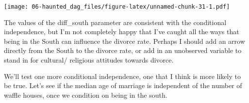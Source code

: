 \documentclass[
]{book}
\newenvironment{Shaded}{\begin{snugshade}}{\end{snugshade}}
\newcommand{\AttributeTok}[1]{\textcolor[rgb]{0.77,0.63,0.00}{#1}}
\newcommand{\DecValTok}[1]{\textcolor[rgb]{0.00,0.00,0.81}{#1}}
\newcommand{\FloatTok}[1]{\textcolor[rgb]{0.00,0.00,0.81}{#1}}
\newcommand{\FunctionTok}[1]{\textcolor[rgb]{0.00,0.00,0.00}{#1}}
\newcommand{\NormalTok}[1]{#1}
\newcommand{\OtherTok}[1]{\textcolor[rgb]{0.56,0.35,0.01}{#1}}
\newcommand{\SpecialCharTok}[1]{\textcolor[rgb]{0.00,0.00,0.00}{#1}}
\begin{document}
\texttt{[image: 06-haunted\_dag\_files/figure-latex/unnamed-chunk-31-1.pdf]}

The values of the diff\_south parameter are consistent with the conditional independence, but I'm not completely happy that I've caught all the ways that being in the South can influence the divorce rate. Perhaps I should add an arrow directly from the South to the divorce rate, or add in an unobserved variable to stand in for cultural/ religious attitudes towards divorce.

We'll test one more conditional independence, one that I think is more likely to be true. Let's see if the median age of marriage is independent of the number of waffle houses, once we condition on being in the south.

\begin{Shaded}
\end{Shaded}
\end{document}
